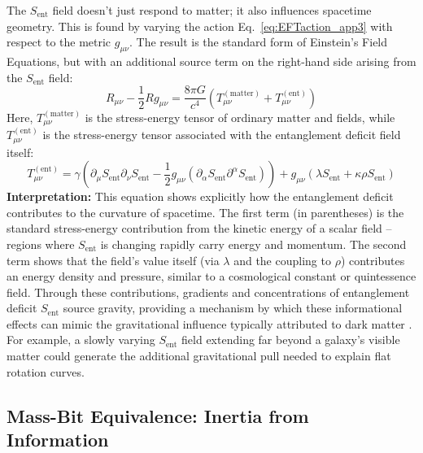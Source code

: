 \documentclass[11pt]{article}
\begin{document}
The $S_{\mathrm{ent}}$ field doesn't just respond to matter; it also influences spacetime geometry. This is found by varying the action Eq.~\eqref{eq:EFTaction_app3} with respect to the metric $g_{\mu\nu}$. The result is the standard form of Einstein's Field Equations, but with an additional source term on the right-hand side arising from the $S_{\mathrm{ent}}$ field:
\begin{equation*}
R_{\mu\nu} - \frac{1}{2} R g_{\mu\nu} = \frac{8\pi G}{c^4} \left( T_{\mu\nu}^{(\mathrm{matter})} + T_{\mu\nu}^{(\mathrm{ent})} \right)
\end{equation*}
Here, $T_{\mu\nu}^{(\mathrm{matter})}$ is the stress-energy tensor of ordinary matter and fields, while $T_{\mu\nu}^{(\mathrm{ent})}$ is the stress-energy tensor associated with the entanglement deficit field itself:
\begin{equation}
T_{\mu\nu}^{(\mathrm{ent})} = \gamma \left( \partial_\mu S_{\mathrm{ent}} \partial_\nu S_{\mathrm{ent}} - \frac{1}{2} g_{\mu\nu} (\partial_\alpha S_{\mathrm{ent}} \partial^\alpha S_{\mathrm{ent}}) \right) + g_{\mu\nu} (\lambda S_{\mathrm{ent}} + \kappa \rho S_{\mathrm{ent}}) \label{eq:Tmn_ent_app3}
\end{equation}
\textbf{Interpretation:} This equation shows explicitly how the entanglement deficit contributes to the curvature of spacetime. The first term (in parentheses) is the standard stress-energy contribution from the kinetic energy of a scalar field – regions where $S_{\mathrm{ent}}$ is changing rapidly carry energy and momentum. The second term shows that the field's value itself (via $\lambda$ and the coupling to $\rho$) contributes an energy density and pressure, similar to a cosmological constant or quintessence field. Through these contributions, gradients and concentrations of entanglement deficit $S_{\mathrm{ent}}$ source gravity, providing a mechanism by which these informational effects can mimic the gravitational influence typically attributed to dark matter \cite{Chinitz2025}. For example, a slowly varying $S_{\mathrm{ent}}$ field extending far beyond a galaxy's visible matter could generate the additional gravitational pull needed to explain flat rotation curves.

\subsection{Mass-Bit Equivalence: Inertia from Information}
\end{document}
